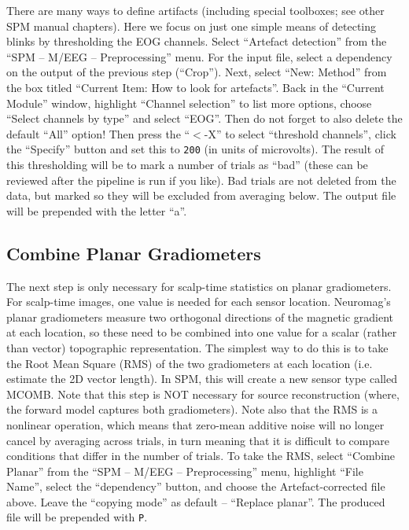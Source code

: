 There are many ways to define artifacts (including special toolboxes; see other SPM manual chapters). Here we focus on just one simple means of detecting blinks by thresholding the EOG channels. Select ``Artefact detection'' from the ``SPM -- M/EEG -- Preprocessing'' menu. For the input file, select a dependency on the output of the previous step (``Crop''). Next, select ``New: Method'' from the box titled ``Current Item: How to look for artefacts''. Back in the ``Current Module'' window, highlight ``Channel selection'' to list more options, choose ``Select channels by type'' and select ``EOG''. Then do not forget to also delete the default ``All'' option! Then press the ``\(<\)-X'' to select ``threshold channels'', click the ``Specify'' button and set this to \texttt{200} (in units of microvolts). The result of this thresholding will be to mark a number of trials as ``bad'' (these can be reviewed after the pipeline is run if you like). Bad trials are not deleted from the data, but marked so they will be excluded from averaging below. The output file will be prepended with the letter ``a''. 

\subsection{Combine Planar Gradiometers}

The next step is only necessary for scalp-time statistics on planar gradiometers. For scalp-time images, one value is needed for each sensor location. Neuromag's planar gradiometers measure two orthogonal directions of the magnetic gradient at each location, so these need to be combined into one value for a scalar (rather than vector) topographic representation. The simplest way to do this is to take the Root Mean Square (RMS) of the two gradiometers at each location (i.e. estimate the 2D vector length). In SPM, this will create a new sensor type called MCOMB. Note that this step is NOT necessary for source reconstruction (where, the forward model captures both gradiometers). Note also that the RMS is a nonlinear operation, which means that zero-mean additive noise will no longer cancel by averaging across trials, in turn meaning that it is difficult to compare conditions that differ in the number of trials. To take the RMS, select ``Combine Planar'' from the ``SPM -- M/EEG -- Preprocessing'' menu, highlight ``File Name'', select the ``dependency'' button, and choose the Artefact-corrected file above. Leave the ``copying mode'' as default -- ``Replace planar''.  The produced file will be prepended with \texttt{P}.

